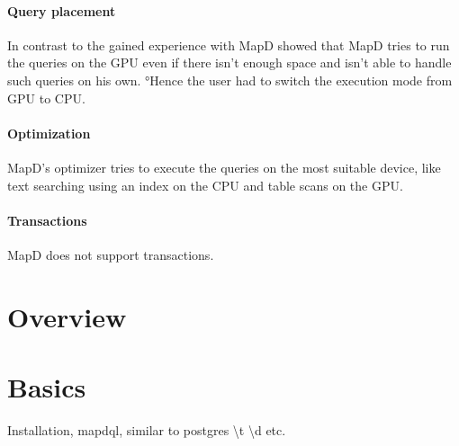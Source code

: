 \paragraph{Query placement} In contrast to \cite{bress2014gpu} the gained experience with MapD showed that MapD tries to run the queries on the GPU even if there isn't enough space and isn't able to handle such queries on his own.
°Hence the user had to switch the execution mode from GPU to CPU.
\paragraph{Optimization} MapD's optimizer tries to execute the queries on the most suitable device, like text searching using an index on the CPU and table scans on the GPU.
\paragraph{Transactions} MapD does not support transactions.


\newpage

\section{Overview}

\section{Basics}
Installation,
mapdql,
similar to postgres \textbackslash t \textbackslash d
etc.